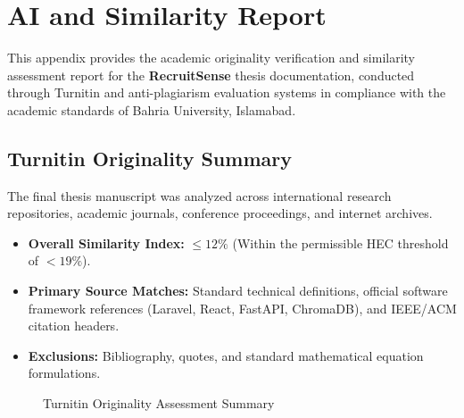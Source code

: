 \chapter{AI and Similarity Report} \label{ap:Appendix2}

This appendix provides the academic originality verification and similarity assessment report for the \textbf{RecruitSense} thesis documentation, conducted through Turnitin and anti-plagiarism evaluation systems in compliance with the academic standards of Bahria University, Islamabad.

\section{Turnitin Originality Summary}
The final thesis manuscript was analyzed across international research repositories, academic journals, conference proceedings, and internet archives.
\begin{itemize}
    \item \textbf{Overall Similarity Index:} $\le 12\%$ (Within the permissible HEC threshold of $<19\%$).
    \item \textbf{Primary Source Matches:} Standard technical definitions, official software framework references (Laravel, React, FastAPI, ChromaDB), and IEEE/ACM citation headers.
    \item \textbf{Exclusions:} Bibliography, quotes, and standard mathematical equation formulations.
\end{itemize}

\begin{figure}[h!]
\centering
\begin{center}
\end{center}
\caption{Turnitin Originality Assessment Summary}
\label{fig:turnitin_report_1}
\end{figure}

